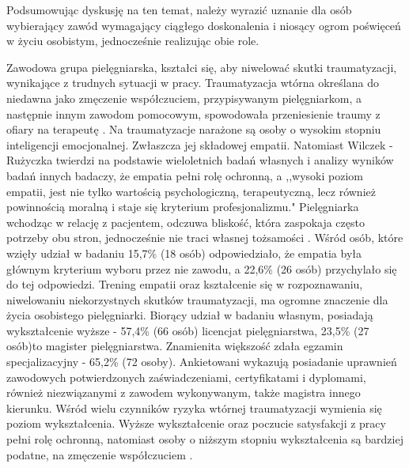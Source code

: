 \documentclass[a4paper,12pt,twoside,openright]{mwrep}
\begin{document}
Podsumowując dyskusję na ten temat, należy wyrazić uznanie dla osób wybierający zawód wymagający ciągłego doskonalenia i niosący ogrom poświęceń w życiu osobistym, jednocześnie realizując obie role.

Zawodowa grupa pielęgniarska, kształci się, aby niwelować skutki traumatyzacji, wynikające z trudnych sytuacji w pracy. Traumatyzacja wtórna określana do niedawna jako zmęczenie współczuciem, przypisywanym pielęgniarkom, a następnie innym zawodom pomocowym, spowodowała przeniesienie traumy z ofiary na terapeutę \cite{figley}. Na traumatyzacje narażone są osoby o wysokim stopniu inteligencji emocjonalnej. Zwłaszcza jej składowej empatii. Natomiast Wilczek - Rużyczka twierdzi na podstawie wieloletnich badań własnych i analizy wyników badań innych badaczy, że empatia pełni rolę ochronną, a ,,wysoki poziom empatii, jest nie tylko wartością psychologiczną, terapeutyczną, lecz również powinnością moralną i staje się kryterium profesjonalizmu."  Pielęgniarka wchodząc w relację z pacjentem, odczuwa bliskość, która zaspokaja często potrzeby obu stron, jednocześnie nie traci własnej tożsamości \cite{wilczek}. Wśród osób, które wzięły udział w badaniu  15,7\% (18 osób) odpowiedziało, że empatia była głównym kryterium wyboru przez nie zawodu, a 22,6\% (26 osób) przychylało się do tej odpowiedzi. Trening empatii oraz kształcenie się w  rozpoznawaniu, niwelowaniu niekorzystnych skutków traumatyzacji,  ma ogromne znaczenie dla życia osobistego pielęgniarki. Biorący udział w badaniu własnym,  posiadają wykształcenie wyższe - 57,4\% (66 osób) licencjat pielęgniarstwa,  23,5\% (27 osób)to magister pielęgniarstwa. Znamienita większość zdała egzamin specjalizacyjny - 65,2\% (72 osoby). Ankietowani wykazują posiadanie uprawnień zawodowych potwierdzonych zaświadczeniami, certyfikatami i dyplomami, również niezwiązanymi z zawodem wykonywanym, także magistra innego kierunku. Wśród wielu czynników ryzyka wtórnej traumatyzacji wymienia się poziom wykształcenia. Wyższe wykształcenie oraz poczucie satysfakcji z pracy pełni rolę ochronną, natomiast osoby o niższym stopniu wykształcenia są bardziej podatne, na zmęczenie współczuciem \cite{oginska}.
\end{document}
